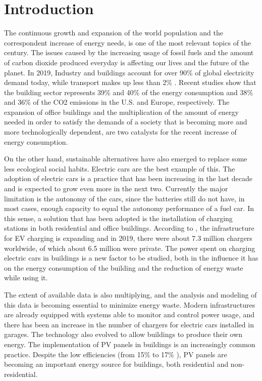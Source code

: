 \chapter{Introduction}
\label{chap:intro}

The continuous growth and expansion of the world population and the correspondent increase of energy needs, is one of the most relevant topics of the century. The issues caused by the increasing usage of fossil fuels and the amount of carbon dioxide produced everyday is affecting our lives and the future of the planet. In 2019, Industry and buildings account for over 90\% of global electricity demand today, while transport makes up less than 2\% \cite{iea}. Recent studies show that the building sector represents 39\% and 40\% of the energy consumption and 38\% and 36\% of the CO2 emissions in the U.S. \cite{CivilUS} and Europe\cite{CivilEU}, respectively. The expansion of office buildings and the multiplication of the amount of energy needed in order to satisfy the demands of a society that is becoming more and more technologically dependent, are two catalysts for the recent increase of energy consumption. 



On the other hand, sustainable alternatives have also emerged to replace some less ecological social habits. Electric cars are the best example of this. The adoption of electric cars is a practice that has been increasing in the last decade and is expected to grow even more in the next two. Currently the major limitation is the autonomy of the cars, since the batteries still do not have, in most cases, enough capacity to equal the autonomy performance of a fuel car. In this sense, a solution that has been adopted is the installation of charging stations in both residential and office buildings. According to \cite{charger}, the infrastructure for \ac{EV} charging is expanding and in 2019, there were about 7.3 million chargers worldwide, of which about 6.5 million were private. The power spent on charging electric cars in buildings is a new factor to be studied, both in the influence it has on the energy consumption of the building and the reduction of energy waste while using it.


The extent of available data is also multiplying, and the analysis and modeling of this data is becoming essential to minimize energy waste. Modern infrastructures are already equipped with systems able to monitor and control power usage, and there has been an increase in the number of chargers for electric cars installed in garages. The technology also evolved to allow buildings to produce their own energy. The implementation of \ac{PV} panels in buildings is an increasingly common practice. Despite the low efficiencies (from 15\% to 17\% \cite{pv}), \ac{PV} panels are becoming an important energy source for buildings, both  residential and non-residential. 


